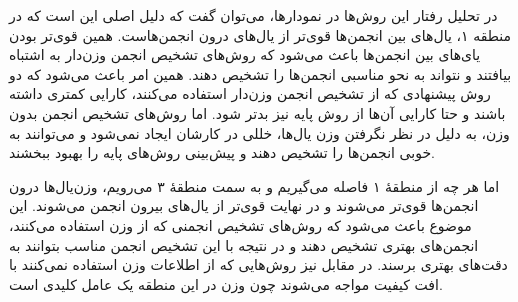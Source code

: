
در تحلیل رفتار این روش‌ها در نمودارها، می‌توان گفت که دلیل اصلی این است که در منطقه ۱، یال‌های بین انجمن‌ها قوی‌تر از یال‌های درون انجمن‌هاست. همین قوی‌تر بودن یای‌های بین انجمن‌ها باعث می‌شود که روش‌های تشخیص انجمن وزن‌دار به اشتباه بیافتند و نتواند به نحو مناسبی انجمن‌ها را تشخیص دهند. همین امر باعث می‌شود که دو روش پیشنهادی که از تشخیص انجمن وزن‌دار استفاده می‌کنند، کارایی کمتری داشته باشند و حتا کارایی آن‌ها از روش پایه نیز بدتر شود. اما روش‌های تشخیص انجمن بدون وزن، به دلیل در نظر نگرفتن وزن یال‌ها، خللی در کارشان ایجاد نمی‌شود و می‌توانند به خوبی انجمن‌ها را تشخیص دهند و پیش‌بینی روش‌های پایه را بهبود ببخشند.

اما هر چه از منطقهٔ ۱ فاصله می‌گیریم و به سمت منطقهٔ ۳ می‌رویم، وزن‌یال‌ها درون انجمن‌ها قوی‌تر می‌شوند و در نهایت قوی‌تر از یال‌های بیرون انجمن می‌شوند. این موضوع باعث می‌شود که روش‌های تشخیص انجمنی که از وزن استفاده می‌کنند، انجمن‌های بهتری تشخیص دهند و در نتیجه با این تشخیص انجمن مناسب بتوانند به دقت‌های بهتری برسند. در مقابل نیز روش‌هایی که از اطلاعات وزن استفاده نمی‌کنند با افت کیفیت مواجه می‌شوند چون وزن در این منطقه یک عامل کلیدی است.

